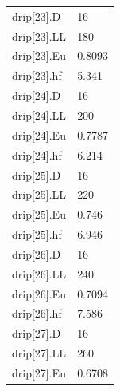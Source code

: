 {\begin{longtable}{p{}p{}}
{}drip[23].D & 16\\
{}drip[23].LL & 180\\
{}drip[23].Eu & 0.8093\\
{}drip[23].hf & 5.341\\
{}drip[24].D & 16\\
{}drip[24].LL & 200\\
{}drip[24].Eu & 0.7787\\
{}drip[24].hf & 6.214\\
{}drip[25].D & 16\\
{}drip[25].LL & 220\\
{}drip[25].Eu & 0.746\\
{}drip[25].hf & 6.946\\
{}drip[26].D & 16\\
{}drip[26].LL & 240\\
{}drip[26].Eu & 0.7094\\
{}drip[26].hf & 7.586\\
{}drip[27].D & 16\\
{}drip[27].LL & 260\\
{}drip[27].Eu & 0.6708\\
\bottomrule\end{longtable}}

